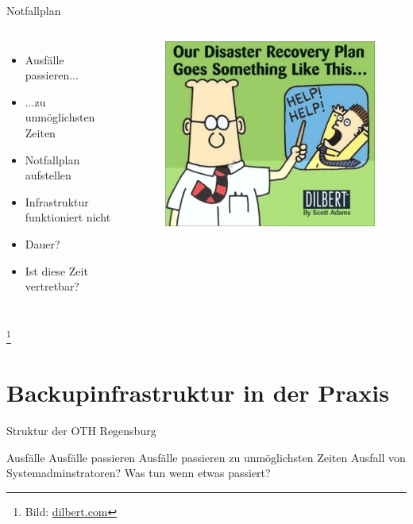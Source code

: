 \documentclass[10pt]{beamer}
\newcommand\blfootnote[1]{%
	\begingroup
	\renewcommand\thefootnote{}\footnote{#1}%
	\addtocounter{footnote}{-1}%
	\endgroup
}
\begin{document}
%
%
\begin{frame}[fragile]{Notfallplan}
\begin{columns}[T,c,onlytextwidth]
	\begin{itemize}
		\item Ausfälle passieren...
		\item ...zu unmöglichsten Zeiten
		\item Notfallplan aufstellen
		\item Infrastruktur funktioniert nicht
		\item Dauer?
		\item Ist diese Zeit vertretbar?
	\end{itemize}
	\begin{figure}
		\includegraphics[width=1\textwidth]{images/dilbert}
	\end{figure}
\end{columns}

\blfootnote{Bild: \href{https://www.dilbert.com}{dilbert.com}}
\end{frame}

\section{Backupinfrastruktur in der Praxis}

\begin{frame}[fragile]{Struktur der OTH Regensburg}
\begin{alertblock}{Ausfälle}
	Ausfälle passieren
	Ausfälle passieren zu unmöglichsten Zeiten
	Ausfall von Systemadminstratoren?
	Was tun wenn etwas passiert?
\end{alertblock}
\end{frame}
\end{document}
